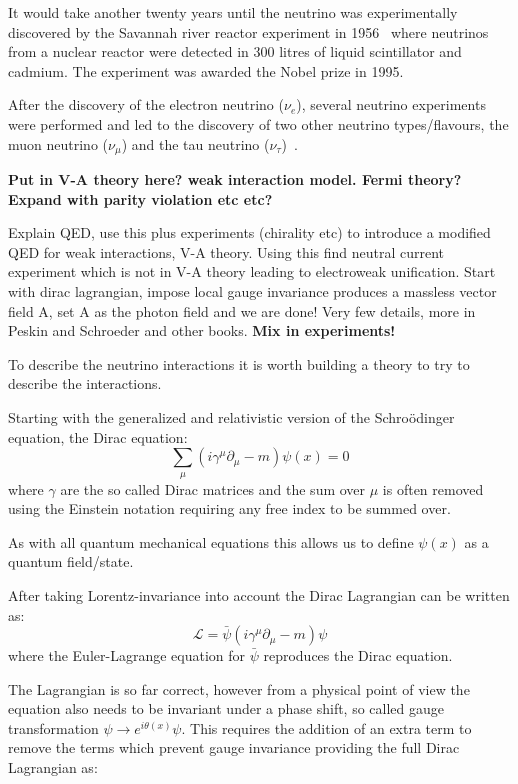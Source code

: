 It would take another twenty years until the neutrino was experimentally discovered by the Savannah river reactor experiment in 1956~\cite{6Reines} where neutrinos from a nuclear reactor were detected in 300 litres of liquid scintillator and cadmium. The experiment was awarded the Nobel prize in 1995.

After the discovery of the electron neutrino ($\nu_e$), several neutrino experiments were performed and led to the discovery of two other neutrino types/flavours, the muon neutrino ($\nu_\mu$) and the tau neutrino ($\nu_\tau$)~\cite{7Danby, 8Perl, Fix1}.

\textbf{Put in V-A theory here? weak interaction model. Fermi theory?}
\textbf{Expand with parity violation etc etc?}

Explain QED, use this plus experiments (chirality etc) to introduce a modified QED for weak interactions, V-A theory. Using this find neutral current experiment which is not in V-A theory leading to electroweak unification.
Start with dirac lagrangian, impose local gauge invariance produces a massless vector field A, set A as the photon field and we are done! 
Very few details, more in Peskin and Schroeder and other books.
\textbf{Mix in experiments!}
\fi

To describe the neutrino interactions it is worth building a theory to try to describe the interactions. 

Starting with the generalized and relativistic version of the Schro\"{o}dinger equation, the Dirac equation:
\begin{equation}
\sum_\mu (i\gamma^\mu \partial_\mu - m)\psi(x) = 0
\end{equation}
where $\gamma$ are the so called Dirac matrices and the sum over $\mu$ is often removed using the Einstein notation requiring any free index to be summed over.

As with all quantum mechanical equations this allows us to define $\psi(x)$ as a quantum field/state.

After taking Lorentz-invariance into account the Dirac Lagrangian can be written as:
\begin{equation}
\mathcal{L} = \bar{\psi}(i\gamma^\mu\partial_\mu-m)\psi
\end{equation}
where the Euler-Lagrange equation for $\bar{\psi}$ reproduces the Dirac equation.

The Lagrangian is so far correct, however from a physical point of view the equation also needs to be invariant under a phase shift, so called gauge transformation $\psi \rightarrow e^{i\theta(x)}\psi$. This requires the addition of an extra term to remove the terms which prevent gauge invariance providing the full Dirac Lagrangian as:

